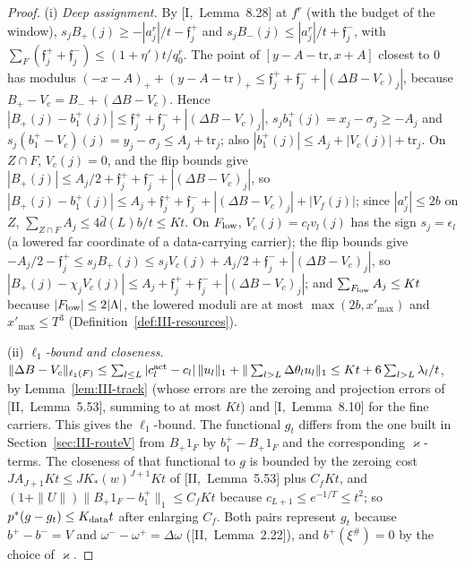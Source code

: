\documentclass[10pt]{amsart}
\theoremstyle{definition}
\theoremstyle{remark}
\begin{document}
\begin{proof}
(i) \emph{Deep assignment.}  By [I,~Lemma~8.28] at $f^r$ (with the budget of the
window), $s_jB_+(j)\ge-|a^r_j|/t-\mathfrak f^+_j$ and $s_jB_-(j)\le|a^r_j|/t+
\mathfrak f^-_j$, with $\sum_F(\mathfrak f^+_j+\mathfrak f^-_j)\le(1+\eta')t/
q^r_0$.  The point of $[y-A-\mathrm{tr},x+A]$ closest to $0$ has modulus
$(-x-A)_++(y-A-\mathrm{tr})_+\le\mathfrak f^+_j+\mathfrak f^-_j+|(\Delta B-V_c)_j|$,
because $B_+-V_c=B_-+(\Delta B-V_c)$.  Hence $|B_+(j)-b^+_1(j)|\le\mathfrak f^+_j+
\mathfrak f^-_j+|(\Delta B-V_c)_j|$, $s_jb^+_1(j)=x_j-\sigma_j\ge-A_j$ and
$s_j(b^+_1-V_c)(j)=y_j-\sigma_j\le A_j+\mathrm{tr}_j$; also $|b^+_1(j)|\le A_j+
|V_c(j)|+\mathrm{tr}_j$.  On $Z\cap F$, $V_c(j)=0$, and the flip bounds give
$|B_+(j)|\le A_j/2+\mathfrak f^+_j+\mathfrak f^-_j+|(\Delta B-V_c)_j|$, so
$|B_+(j)-b^+_1(j)|\le A_j+\mathfrak f^+_j+\mathfrak f^-_j+|(\Delta B-V_c)_j|+
|V_f(j)|$; since $|a^r_j|\le2b$ on $Z$, $\sum_{Z\cap F}A_j\le4\bar d(L)b/t\le Kt$.
On $F_{\rm low}$, $V_c(j)=c_lv_l(j)$ has the sign
$s_j=\epsilon_l$ (a lowered far coordinate of a data-carrying carrier); the
flip bounds give
$-A_j/2-\mathfrak f^+_j\le s_jB_+(j)\le s_jV_c(j)+A_j/2+\mathfrak f^-_j+|(\Delta B-
V_c)_j|$, so $|B_+(j)-\chi_jV_c(j)|\le A_j+\mathfrak f^+_j+\mathfrak f^-_j+
|(\Delta B-V_c)_j|$; and $\sum_{F_{\rm low}}A_j\le Kt$ because $|F_{\rm low}|\le
2|\Lambda|$, the lowered moduli are at most $\max(2b,x'_{\max})$ and
$x'_{\max}\le T^3$ (Definition~\ref{def:III-resources}).

(ii) \emph{$\ell_1$-bound and closeness.}  $\|\Delta B-V_c\|_{\ell_1(F)}\le
\sum_{l\le L}|c^{\rm act}_l-c_l|\,\|u_l\|_1+\|\sum_{l>L}\Delta\theta_lu_l\|_1
\le Kt+6\sum_{l>L}\lambda_l/t$, by Lemma~\ref{lem:III-track} (whose errors are
the zeroing and projection errors of [II,~Lemma~5.53], summing to at most $Kt$)
and [I,~Lemma~8.10] for the fine carriers.  This gives the $\ell_1$-bound.  The
functional $g_t$ differs from the one built in Section~\ref{sec:III-routeV}
from $B_+1_F$ by $b^+_1-B_+1_F$ and the corresponding $\varkappa$-terms.  The
closeness of that functional to $g$ is bounded by the zeroing cost
$JA_{J+1}Kt\le JK_*(w)^{J+1}Kt$ of [II,~Lemma~5.53] plus $C_fKt$, and
$(1+\|U\|)\|B_+1_F-b^+_1\|_1\le C_fKt$ because $c_{L+1}\le e^{-1/T}\le t^2$; so
$p^*(g-g_t)\le K_{\rm data}t$ after enlarging $C_f$.  Both pairs represent $g_t$ because $b^+-b^-=V$ and
$\omega^--\omega^+=\Delta\omega$ ([II,~Lemma~2.22]), and $b^+(\xi^\#)=0$ by the
choice of $\varkappa$.


\end{proof}
\end{document}
